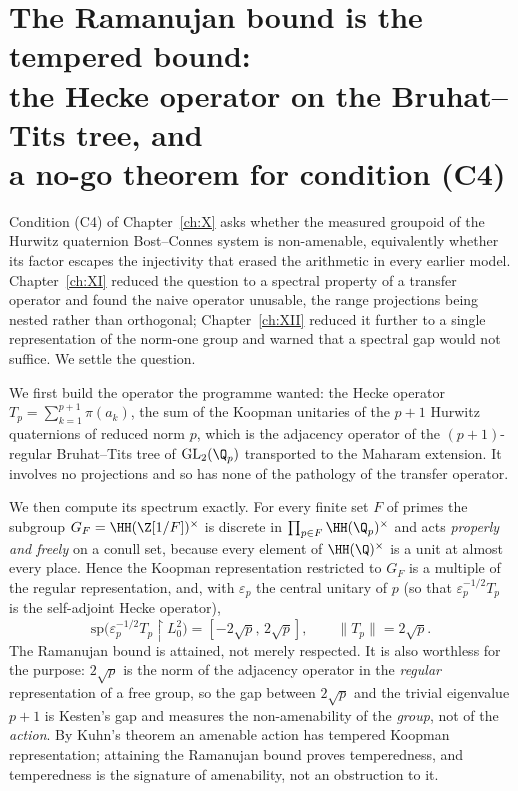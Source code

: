 \chapter[The Ramanujan bound is the tempered bound]{The Ramanujan bound is the tempered bound:\\ the Hecke operator on the Bruhat--Tits tree, and\\ a no-go theorem for condition (C4)}\label{ch:XXVIII}
\begin{summary}
Condition (C4) of Chapter~\ref{ch:X} asks whether the measured groupoid of the Hurwitz
quaternion Bost--Connes system is non-amenable, equivalently whether its factor escapes the
injectivity that erased the arithmetic in every earlier model. Chapter~\ref{ch:XI} reduced the question to a
spectral property of a transfer operator and found the naive operator unusable, the range
projections being nested rather than orthogonal; Chapter~\ref{ch:XII} reduced it further to a single
representation of the norm-one group and warned that a spectral gap would not suffice. We settle
the question.

We first build the operator the programme wanted: the Hecke operator
$T_p=\sum_{k=1}^{p+1}\pi(a_k)$, the sum of the Koopman unitaries of the $p+1$ Hurwitz quaternions
of reduced norm $p$, which is the adjacency operator of the $(p+1)$-regular Bruhat--Tits tree of
$\mathrm{GL}_2(\Q_p)$ transported to the Maharam extension. It involves no projections and so has
none of the pathology of the transfer operator.

We then compute its spectrum exactly. For every finite set $F$ of primes the subgroup
$G_F=\HH(\Z[1/F])^\times$ is discrete in $\prod_{p\in F}\HH(\Q_p)^\times$ and acts \emph{properly
and freely} on a conull set, because every element of $\HH(\Q)^\times$ is a unit at almost every
place. Hence the Koopman representation restricted to $G_F$ is a multiple of the regular
representation, and, with $\varepsilon_p$ the central unitary of $p$ (so that
$\varepsilon_p^{-1/2}T_p$ is the self-adjoint Hecke operator),
\[
\mathrm{sp}\bigl(\varepsilon_p^{-1/2}T_p\restriction L^2_0\bigr)=[-2\sqrt p,\,2\sqrt p],\qquad \|T_p\|=2\sqrt p .
\]
The Ramanujan bound is attained, not merely respected. It is also worthless for the purpose:
$2\sqrt p$ is the norm of the adjacency operator in the \emph{regular} representation of a free
group, so the gap between $2\sqrt p$ and the trivial eigenvalue $p+1$ is Kesten's gap and measures
the non-amenability of the \emph{group}, not of the \emph{action}. By Kuhn's theorem an amenable
action has tempered Koopman representation; attaining the Ramanujan bound proves temperedness, and
temperedness is the signature of amenability, not an obstruction to it.


\end{summary}
